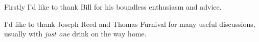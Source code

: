 \clearpage

Firstly I'd like to thank Bill for his boundless enthusiasm and advice.


I'd like to thank Joseph Reed and Thomas Furnival for many useful discussions, usually with \emph{just one} drink on the way home.



























































